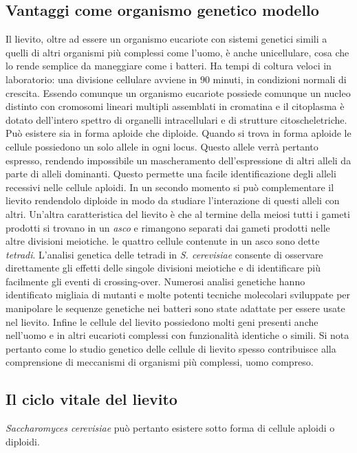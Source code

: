 	\subsection*{Vantaggi come organismo genetico modello}
	Il lievito, oltre ad essere un organismo eucariote con sistemi genetici simili a quelli di altri organismi pi\`u complessi come l'uomo, \`e anche unicellulare, cosa che lo rende semplice da maneggiare come i batteri.
	Ha tempi di coltura veloci in laboratorio: una divisione cellulare avviene in $90$ minuti, in condizioni normali di crescita.
	Essendo comunque un organismo eucariote possiede comunque un nucleo distinto con cromosomi lineari multipli assemblati in cromatina e il citoplasma \`e dotato dell'intero spettro di organelli intracellulari e di strutture citoscheletriche.
	Pu\`o esistere sia in forma aploide che diploide.
	Quando si trova in forma aploide le cellule possiedono un solo allele in ogni locus.
	Questo allele verr\`a pertanto espresso, rendendo impossibile un mascheramento dell'espressione di altri alleli da parte di alleli dominanti.
	Questo permette una facile identificazione degli alleli recessivi nelle cellule aploidi.
	In un secondo momento si pu\`o complementare il lievito rendendolo diploide in modo da studiare l'interazione di questi alleli con altri.
	Un'altra caratteristica del lievito \`e che al termine della meiosi tutti i gameti prodotti si trovano in un \emph{asco} e rimangono separati dai gameti prodotti nelle altre divisioni meiotiche.
	le quattro cellule contenute in un asco sono dette \emph{tetradi}.
	L'analisi genetica delle tetradi in \emph{S. cerevisiae} consente di osservare direttamente gli effetti delle singole divisioni meiotiche e di identificare pi\`u facilmente gli eventi di crossing-over.
	Numerosi analisi genetiche hanno identificato migliaia di mutanti e molte potenti tecniche molecolari sviluppate per manipolare le sequenze genetiche nei batteri sono state adattate per essere usate nel lievito.
	Infine le cellule del lievito possiedono molti geni presenti anche nell'uomo e in altri eucarioti complessi con funzionalit\`a identiche o simili.
	Si nota pertanto come lo studio genetico delle cellule di lievito spesso contribuisce alla comprensione di meccanismi di organismi pi\`u complessi, uomo compreso.

	\subsection*{Il ciclo vitale del lievito}
	\emph{Saccharomyces cerevisiae} pu\`o pertanto esistere sotto forma di cellule aploidi o diploidi.

